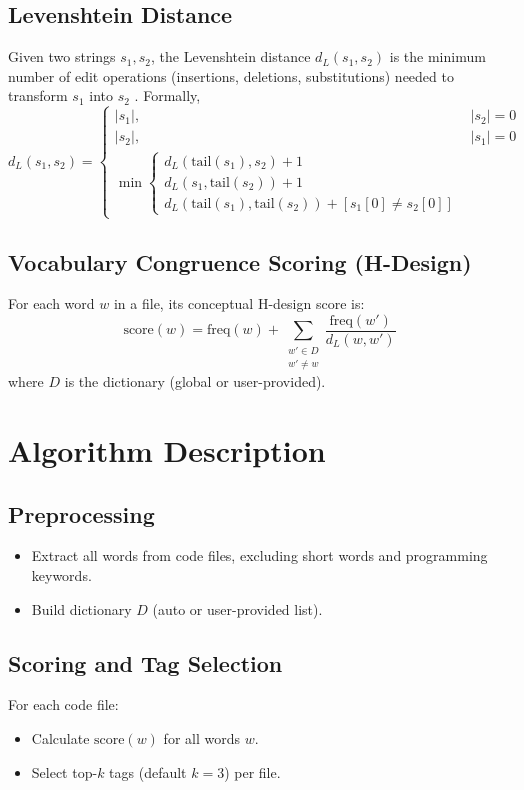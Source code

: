 \documentclass[a4paper,12pt]{article}
\begin{document}
\subsection{Levenshtein Distance}
Given two strings $s_1, s_2$, the Levenshtein distance $d_L(s_1, s_2)$ is the minimum number of edit operations (insertions, deletions, substitutions) needed to transform $s_1$ into $s_2$ \cite{Levenshtein1966}. Formally,
\begin{equation}
d_L(s_1, s_2) = 
\begin{cases}
|s_1|, & |s_2| = 0 \\
|s_2|, & |s_1| = 0 \\
\min \begin{cases}
d_L(\text{tail}(s_1), s_2) + 1 \\
d_L(s_1, \text{tail}(s_2)) + 1 \\
d_L(\text{tail}(s_1), \text{tail}(s_2)) + [s_1[0] \neq s_2[0]]
\end{cases}
\end{cases}
\end{equation}

\subsection{Vocabulary Congruence Scoring (H-Design)}
For each word $w$ in a file, its conceptual H-design score is:
\begin{equation}
\text{score}(w) = \text{freq}(w) + \sum_{\substack{w' \in D \\ w' \neq w}} \frac{\text{freq}(w')}{d_L(w, w')}
\end{equation}
where $D$ is the dictionary (global or user-provided).

\section{Algorithm Description}
\subsection{Preprocessing}
\begin{itemize}
    \item Extract all words from code files, excluding short words and programming keywords.
    \item Build dictionary $D$ (auto or user-provided list).
\end{itemize}

\subsection{Scoring and Tag Selection}
For each code file:
\begin{itemize}
    \item Calculate $\text{score}(w)$ for all words $w$.
    \item Select top-$k$ tags (default $k=3$) per file.
\end{itemize}
\end{document}
